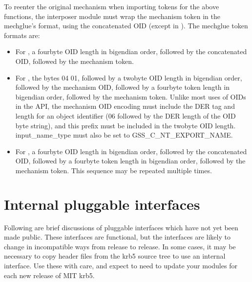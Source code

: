 \documentclass[letterpaper,10pt,english]{sphinxmanual}
\begin{document}
\sphinxAtStartPar
To re\sphinxhyphen{}enter the original mechanism when importing tokens for the above
functions, the interposer module must wrap the mechanism token in the
mechglue’s format, using the concatenated OID (except in
).  The mechglue token formats are:
\begin{itemize}
\item {} 
\sphinxAtStartPar
For , a four\sphinxhyphen{}byte OID length in big\sphinxhyphen{}endian
order, followed by the concatenated OID, followed by the mechanism
token.

\item {} 
\sphinxAtStartPar
For , the bytes 04 01, followed by a two\sphinxhyphen{}byte OID
length in big\sphinxhyphen{}endian order, followed by the mechanism OID, followed
by a four\sphinxhyphen{}byte token length in big\sphinxhyphen{}endian order, followed by the
mechanism token.  Unlike most uses of OIDs in the API, the mechanism
OID encoding must include the DER tag and length for an object
identifier (06 followed by the DER length of the OID byte string),
and this prefix must be included in the two\sphinxhyphen{}byte OID length.
input\_name\_type must also be set to GSS\_C\_NT\_EXPORT\_NAME.

\item {} 
\sphinxAtStartPar
For , a four\sphinxhyphen{}byte OID length in big\sphinxhyphen{}endian order,
followed by the concatenated OID, followed by a four\sphinxhyphen{}byte token
length in big\sphinxhyphen{}endian order, followed by the mechanism token.  This
sequence may be repeated multiple times.

\end{itemize}

\sphinxstepscope


\section{Internal pluggable interfaces}
\label{\detokenize{plugindev/internal:internal-pluggable-interfaces}}\label{\detokenize{plugindev/internal::doc}}
\sphinxAtStartPar
Following are brief discussions of pluggable interfaces which have not
yet been made public.  These interfaces are functional, but the
interfaces are likely to change in incompatible ways from release to
release.  In some cases, it may be necessary to copy header files from
the krb5 source tree to use an internal interface.  Use these with
care, and expect to need to update your modules for each new release
of MIT krb5.
\end{document}

